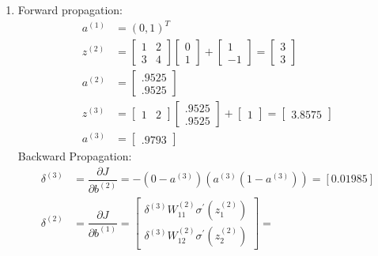 \documentclass[12pt]{article}
\begin{document}
\begin{enumerate}
	\item Forward propagation:
	\begin{align*}
		a^{(1)} &= (0,1)^T\\
		z^{(2)} &= 
			\begin{bmatrix}
				1 & 2\\
				3 & 4
			\end{bmatrix}
			\begin{bmatrix}
				0\\
				1
			\end{bmatrix}
		+
			\begin{bmatrix}
				1\\
				-1
			\end{bmatrix}
		=
			\begin{bmatrix}
				3\\
				3
			\end{bmatrix}\\
		a^{(2)} &= 
			\begin{bmatrix}
				.9525\\
				.9525
			\end{bmatrix}\\
		z^{(3)} &= 
			\begin{bmatrix}
				1 & 2
			\end{bmatrix}
			\begin{bmatrix}
				.9525\\
				.9525
			\end{bmatrix}
		+
			\begin{bmatrix}
				1
			\end{bmatrix}
		= 	
			\begin{bmatrix}
				3.8575
			\end{bmatrix}\\
		a^{(3)} &=
			\begin{bmatrix}
				.9793
			\end{bmatrix}
	\end{align*}
	Backward Propagation:
	\begin{align*}
		\delta^{(3)} &= \dfrac{\partial J}{\partial b^{(2)}} = 
			-\left(0 - a^{(3)}\right)\left(a^{(3)}\left(1-a^{(3)}\right)\right) = [0.01985]\\
		\delta^{(2)} &= \dfrac{\partial J}{\partial b^{(1)}} = 
			\begin{bmatrix}
				\delta^{(3)} W_{11}^{(2)} \sigma^\prime \left(z_1^{(2)}\right)\\
				\delta^{(3)} W_{12}^{(2)} \sigma^\prime \left(z_2^{(2)}\right)
			\end{bmatrix}
			=

\end{align*}
\end{enumerate}
\end{document}
